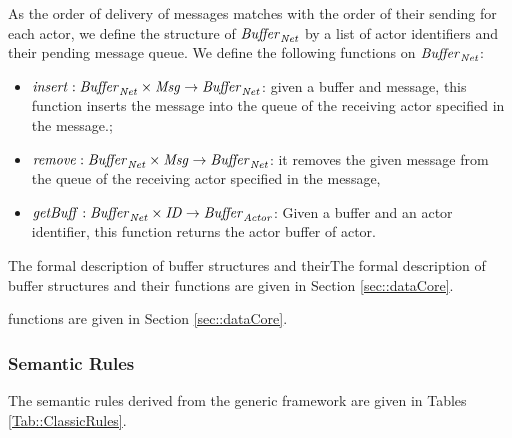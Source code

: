 As the order of delivery of messages matches with the order of their sending for each actor, we define the structure of $\mathit{Buffer}_{\it Net}$ by a list of actor identifiers and their pending message queue. %
We define the following functions on $\mathit{Buffer}_{\it Net}$:\begin{itemize} 
\item $\mathit{insert}:\mathit{Buffer}_{\it Net} \times \mathit{Msg}\rightarrow \mathit{Buffer}_{\it Net}$: given a buffer and message, this function inserts the message into the queue of the receiving actor specified in the message.;
\item $\mathit{remove}:\mathit{Buffer}_{\it Net} \times \mathit{Msg} \rightarrow \mathit{Buffer}_{\it Net} $: it removes the given message from the queue of the receiving actor specified in the message,
\item ${\it getBuff}:\mathit{Buffer}_{\it Net} \times \mathit{ID} \rightarrow \mathit{Buffer}_{\it Actor} $: Given a buffer and an actor identifier, this function returns the actor buffer of actor.
\end{itemize}

The formal description of buffer structures and theirThe formal description of buffer structures and their functions are given in Section \ref{sec::dataCore}.

 functions are given in Section \ref{sec::dataCore}.

\subsubsection{Semantic Rules}
The semantic rules derived from the generic framework are given in Tables \ref{Tab::ClassicRules}. %




